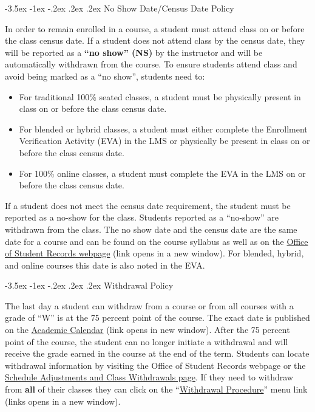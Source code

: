 \documentclass{article}
\makeatletter
\renewcommand\section{\@startsection{section}{1}{0pt}%
  {-3.5ex \@plus -1ex \@minus -.2ex}%
  {.2ex \@plus.2ex}%
  {\normalfont\Large\bfseries}} %
\makeatother
\begin{document}
\section{No Show Date/Census Date Policy}

In order to remain enrolled in a course, a student must attend class on or before the class census date. If a student does not attend class by the census date, they will be reported as a \textbf{``no show'' (NS)} by the instructor and will be automatically withdrawn from the course.  To ensure students attend class and avoid being marked as a ``no show'', students need to:

\begin{itemize}
\item For traditional 100\% seated classes, a student must be physically present in class on or before the class census date.


\item For blended or hybrid classes, a student must either complete the Enrollment Verification Activity (EVA) in the LMS or physically be present in class on or before the class census date.


\item For 100\% online classes, a student must complete the EVA in the LMS on or before the class census date.
\end{itemize}

If a student does not meet the census date requirement, the student must be reported as a no-show for the class. Students reported as a ``no-show'' are withdrawn from the class.  The no show date and the census date are the same date for a course and can be found on the course syllabus as well as on the \href{https://mitchellcc.edu/office-student-records}{Office of Student Records webpage} (link opens in a new window). For blended, hybrid, and online courses this date is also noted in the EVA.

\section{Withdrawal Policy}

The last day a student can withdraw from a course or from all courses with a grade of ``W'' is at the 75 percent point of the course. The exact date is published on the \href{https://www.mitchellcc.edu/wp-content/uploads/2024/05/2024-2025-Academic-Calendar.pdf}{Academic Calendar} (link opens in new window). After the 75 percent point of the course, the student can no longer initiate a withdrawal and will receive the grade earned in the course at the end of the term. Students can locate withdrawal information by visiting the Office of Student Records webpage or the \href{https://www.mitchellcc.edu/schedule-adjustments-and-class-withdrawals/}{Schedule Adjustments and Class Withdrawals page}. If they need to withdraw from \textbf{all} of their classes they can click on the ``\href{https://mitchellcc.edu/withdrawal-procedure}{Withdrawal Procedure}'' menu link (links opens in a new window).
\end{document}
